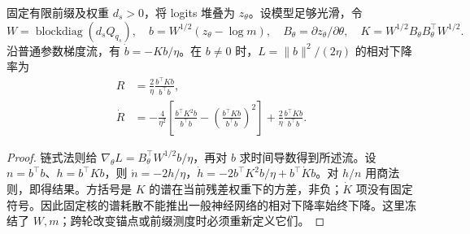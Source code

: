 \begin{proposition}[共享参数下相对下降率的几何修正]
\label{prop:time-varying-kernel}
固定有限前缀及权重 $d_s>0$，将 logits 堆叠为 $z_\theta$。设模型足够光滑，令
\begin{equation}
W=\operatorname{blockdiag}(d_sQ_{q_s}),\quad
b=W^{1/2}(z_\theta-\log m),\quad
B_\theta=\partial z_\theta/\partial\theta,\quad
K=W^{1/2}B_\theta B_\theta^\top W^{1/2}.
\end{equation}
沿普通参数梯度流，有 $\dot b=-Kb/\eta$。在 $b\ne0$ 时，$L=\|b\|^2/(2\eta)$ 的相对下降率为
\begin{align}
R&=\frac2\eta\frac{b^\top Kb}{b^\top b},\\
\dot R&=-\frac4{\eta^2}\left[\frac{b^\top K^2b}{b^\top b}
-\left(\frac{b^\top Kb}{b^\top b}\right)^2\right]
+\frac2\eta\frac{b^\top\dot Kb}{b^\top b}.
\end{align}
\end{proposition}
\begin{proof}
链式法则给 $\nabla_\theta L=B_\theta^\top W^{1/2}b/\eta$，再对 $b$ 求时间导数得到所述流。设 $n=b^\top b$、$h=b^\top Kb$，则 $\dot n=-2h/\eta$，$\dot h=-2b^\top K^2b/\eta+b^\top\dot Kb$。对 $h/n$ 用商法则，即得结果。方括号是 $K$ 的谱在当前残差权重下的方差，非负；$\dot K$ 项没有固定符号。因此固定核的谱耗散不能推出一般神经网络的相对下降率始终下降。这里冻结了 $W,m$；跨轮改变锚点或前缀测度时必须重新定义它们。
\end{proof}


